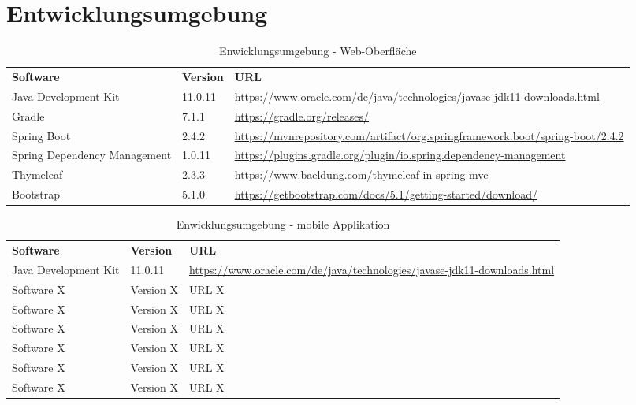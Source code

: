 \newpage
\section{Entwicklungsumgebung}\label{sec:entwicklungsumgebung}

\begin{table}[h]
	\centering
	\begin{tabularx}{\textwidth}{l l X}
		\rowcolor[HTML]{C0C0C0} 
		\textbf{Software} & \textbf{Version} & \textbf{URL} \\
		Java Development Kit & 11.0.11 & \url{https://www.oracle.com/de/java/technologies/javase-jdk11-downloads.html} \\
		\rowcolor[HTML]{E7E7E7} 
		Gradle & 7.1.1 & \url{https://gradle.org/releases/} \\
		Spring Boot & 2.4.2 & \url{https://mvnrepository.com/artifact/org.springframework.boot/spring-boot/2.4.2} \\
		\rowcolor[HTML]{E7E7E7} 
			Spring Dependency Management & 1.0.11 & \url{https://plugins.gradle.org/plugin/io.spring.dependency-management} \\
		Thymeleaf & 2.3.3 & \url{https://www.baeldung.com/thymeleaf-in-spring-mvc} \\
		\rowcolor[HTML]{E7E7E7} 
		Bootstrap & 5.1.0 & \url{https://getbootstrap.com/docs/5.1/getting-started/download/} \\
	\end{tabularx}
	\caption{Enwicklungsumgebung - Web-Oberfl\"ache}
	\label{table:entwicklungsumgebung}
\end{table}

\begin{table}[h]
	\centering
	\begin{tabularx}{\textwidth}{l l X}
		\rowcolor[HTML]{C0C0C0} 
		\textbf{Software} & \textbf{Version} & \textbf{URL} \\
		Java Development Kit & 11.0.11 & \url{https://www.oracle.com/de/java/technologies/javase-jdk11-downloads.html} \\
		\rowcolor[HTML]{E7E7E7} 
		Software X & Version X & URL X \\
		Software X & Version X & URL X \\
		\rowcolor[HTML]{E7E7E7} 
		Software X & Version X & URL X \\
		Software X & Version X & URL X \\
		\rowcolor[HTML]{E7E7E7} 
		Software X & Version X & URL X \\
		Software X & Version X & URL X \\
	\end{tabularx}
	\caption{Enwicklungsumgebung - mobile Applikation}
	\label{table:entwicklungsumgebung}
\end{table}